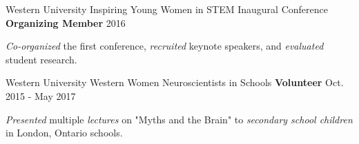 
\begin{cventries}
    
  \cventry
    {Western University} %
    {Inspiring Young Women in STEM Inaugural Conference}
    {\textbf{Organizing Member}} %
    {2016} %
    {
      \begin{cvitems} %
        \item {\textit{Co-organized} the first conference, \textit{recruited} keynote speakers, and \textit{evaluated} student research.}
      \end{cvitems}
    }
    
  \cventry
    {Western University}
    {Western Women Neuroscientists in Schools}
  	{\textbf{Volunteer}} %
    {Oct. 2015 - May 2017} %
    {
      \begin{cvitems} %
        \item {\textit{Presented} multiple \textit{lectures} on "Myths and the Brain" to \textit{secondary school children} in London, Ontario schools.}
      \end{cvitems}
    }
    
    
\end{cventries}
